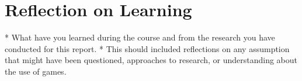 \section{Reflection on Learning}
* What have you learned during the course and from the research you have conducted for this report.
* This should included reflections on any assumption that might have been questioned, approaches to research, or understanding about the use of games.